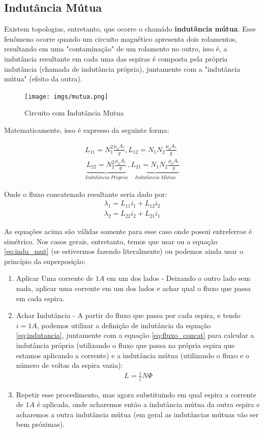 \documentclass{article}
\newcommand{\n}{\nonumber \\ }
\begin{document}
\subsection{Indutância Mútua}
Existem topologias, entretanto, que ocorre o chamádo \textbf{indutãncia mútua}. Esse fenômeno ocorre quando um circuito magnético apresenta dois rolamentos, resultando em uma "contaminação" de um rolamento no outro, isso é, a indutância resultante em cada uma das espiras é composta pela própria indutância (chamada de indutância própria), juntamente com a "indutância mútua" (efeito da outra).

\begin{figure}[h]
    \centering
    \texttt{[image: imgs/mutua.png]}
    \caption{Circuito com Indutância Mutua}
    \label{fig:mutua}
\end{figure}

Matematicamente, isso é expresso da seguinte forma:

\begin{align}
    L_{11} = N_1^2 \frac{\mu_0 A_c}{g}, L_{12} = N_1N_2\frac{\mu_0 A_c}{g} \\ 
    \underbrace{L_{22} = N_2^2 \frac{\mu_0 A_c}{g}}_{Indut\hat{a}ncia \ Pr\acute{o}pria}, \underbrace{L_{21} = N_1N_2\frac{\mu_0 A_c}{g}}_{Indut\hat{a}ncia \ M\acute{u}tua}
\end{align}

Onde o fluxo concatenado resultante seria dado por:
\begin{align}
    \lambda_1 = L_{11}i_1 + L_{12}i_2 \n
    \lambda_2 = L_{22}i_2 + L_{21}i_1
    \label{eq:indu_mut}
\end{align}

As equações acima são válidas somente para esse caso onde possui entreferroe é simétrico. Nos casos gerais, entretanto, temos que usar ou a equação \ref{eq:indu_mut} (se estivermos fazendo literalmente) ou podemos ainda usar o princípio da superposição:
\begin{enumerate}
    \item Aplicar Uma corrente de $1A$ em um dos lados - Deixando o outro lado sem nada, aplicar uma corrente em um dos lados e achar qual o fluxo que passa em cada espira.
    \item Achar Indutância - A partir do fluxo que passa por cada espira, e tendo $i = 1A$, podemos utilizar a definição de indutância da equação \ref{eq:indutancia}, juntamente com a equação \ref{eq:fluxo_concat} para calcular a indutância própria (utilizando o fluxo que passa na própria espira que estamos aplicando a corrente) e a indutância mútua (utilizando o fluxo e o número de voltas da espira vazia):
    \begin{align}
        L = \frac{1}{i} N \Phi
    \end{align}

    \item Repetir esse procedimento, mas agora substituindo em qual espira a corrente de $1A$ é aplicada, onde acharemos então a indutância mútua da outra espira e acharemos a outra indutância mútua (em geral as indutâncias mútuas vão ser bem próximas).
\end{enumerate}
\end{document}
